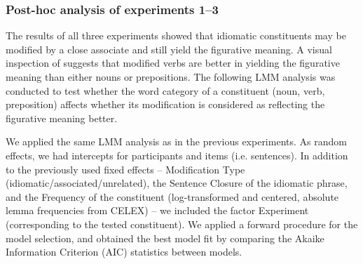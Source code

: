 \documentclass[output=paper]{langsci/langscibook}
\begin{document}
\begin{table}
\caption{Fixed effects of the predictors in the linear mixed-effect model for the paraphrase ratings in Experiment 3. \textit{Notes:} significance code: *** < 0.0001\label{tab:Table7}}
\end{table}


\subsubsection{Post-hoc analysis of experiments 1--3}    

The results of all three experiments showed that idiomatic constituents may be modified by a close associate and still yield the figurative meaning. A visual inspection of  suggests that modified verbs are better in yielding the figurative meaning than either nouns or prepositions. The following LMM analysis was conducted to test whether the word category of a constituent (noun, verb, preposition) affects whether its modification is considered as reflecting the figurative meaning better. 

We applied the same LMM analysis as in the previous experiments. As random effects, we had intercepts for participants and items (i.e. sentences). In addition to the previously used fixed effects -- Modification Type (idiomatic\slash associated\slash unrelated), the Sentence Closure of the idiomatic phrase, and the Frequency of the constituent (log-transformed and centered, absolute lemma frequencies from CELEX) -- we included the factor Experiment (corresponding to the tested constituent).  We applied a forward procedure for the model selection, and obtained the best model fit by comparing the Akaike Information Criterion (AIC) statistics between models. 
\end{document}
